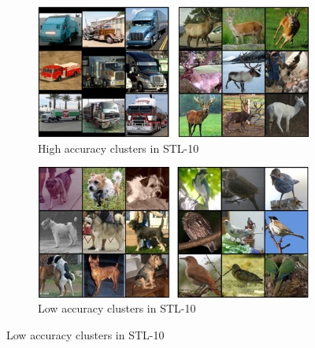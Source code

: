 \documentclass{article}
\begin{document}
\begin{figure}[hbt]
     \centering
     \begin{subfigure}[b]{0.48\textwidth}
         \centering
         \includegraphics[width=\textwidth]{images/high_accuracy_stl10.png}
         \caption{High accuracy clusters in STL-10}
         \label{fig:high_stl10}
     \end{subfigure}
     \hfill
     \begin{subfigure}[b]{0.48\textwidth}
         \centering
         \includegraphics[width=\textwidth]{images/low_accuracy_stl10.png}
         \caption{Low accuracy clusters in STL-10}
         \label{fig:low_stl10}
     \end{subfigure}
     

\end{figure}
\end{document}
